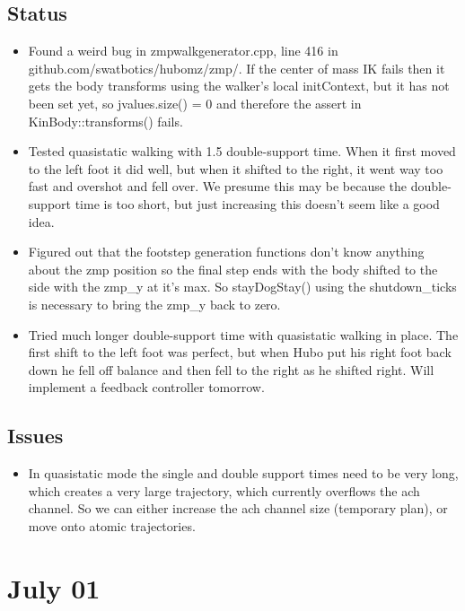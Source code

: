 \documentclass[letterpaper, 10 pt]{report}
\begin{document}
\subsection*{Status}
\begin{itemize}
\item Found a weird bug in zmpwalkgenerator.cpp, line 416 in github.com/swatbotics/hubomz/zmp/. If the center of mass IK fails then it gets the body transforms using the walker's local initContext, but it has not been set yet, so jvalues.size() = 0 and therefore the assert in KinBody::transforms() fails.
\item Tested quasistatic walking with 1.5 double-support time. When it first moved to the left foot it did well, but when it shifted to the right, it went way too fast and overshot and fell over. We presume this may be because the double-support time is too short, but just increasing this doesn't seem like a good idea.
\item Figured out that the footstep generation functions don't know anything about the zmp position so the final step ends with the body shifted to the side with the zmp\_y at it's max. So stayDogStay() using the shutdown\_ticks is necessary to bring the zmp\_y back to zero.
\item Tried much longer double-support time with quasistatic walking in place. The first shift to the left foot was perfect, but when Hubo put his right foot back down he fell off balance and then fell to the right as he shifted right. Will implement a feedback controller tomorrow.
\end{itemize}
\subsection*{Issues}
\begin{itemize}
\item In quasistatic mode the single and double support times need to be very long, which creates a very large trajectory, which currently overflows the ach channel. So we can either increase the ach channel size (temporary plan), or move onto atomic trajectories.
\end{itemize}

\section*{July 01}
\end{document}
